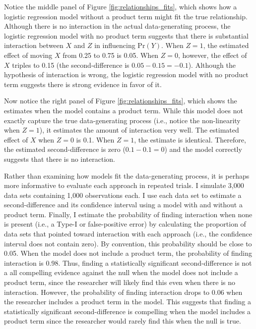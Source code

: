 \documentclass[12pt]{article}
\begin{document}
Notice the middle panel of Figure \ref{fig:relationships_fits}, which shows how a logistic regression model without a product term might fit the true relationship. Although there is no interaction in the actual data-generating process, the logistic regression model with no product term suggests that there is  substantial interaction between $X$ and $Z$ in influencing $\text{Pr}(Y)$. When $Z=1$, the estimated effect of moving $X$ from 0.25 to 0.75 is 0.05. When $Z=0$, however, the effect of $X$ triples to 0.15 (the second-difference is $0.05 - 0.15 = -0.1$). Although the hypothesis of interaction is wrong, the logistic regression model with no product term suggests there is strong evidence in favor of it.

Now notice the right panel of Figure \ref{fig:relationships_fits}, which shows the estimates when the model contains a product term. While this model does not exactly capture the true data-generating process (i.e., notice the non-linearity when $Z = 1$), it estimates the amount of interaction very well. The estimated effect of $X$ when $Z=0$  is 0.1. When $Z = 1$, the estimate is identical. Therefore, the estimated second-difference is zero ($0.1 - 0.1 = 0$) and the model correctly suggests that there is no interaction.

Rather than examining how models fit the data-generating process, it is perhaps more informative to evaluate each approach in repeated trials. I simulate 3,000 data sets containing 1,000 observations each. I use each data set to estimate a second-difference and its confidence interval using a model with and without a product term. Finally, I estimate the probability of finding interaction when none is present (i.e., a Type-I or false-positive error) by calculating the proportion of data sets that pointed toward interaction with each approach (i.e., the confidence interval does not contain zero). By convention, this probability should be close to 0.05. When the model does not include a product term, the probability of finding interaction is 0.98. Thus,  finding a statistically significant second-difference is not a all  compelling evidence against the null when the model does not include a product term, since the researcher will likely find this even when there is no interaction. However, the probability of finding interaction drops to 0.06 when the researcher includes a product term in the model. This suggests that finding a statistically significant second-difference is compelling  when the model includes a product term since the researcher would rarely find this when the null is true.
\end{document}
